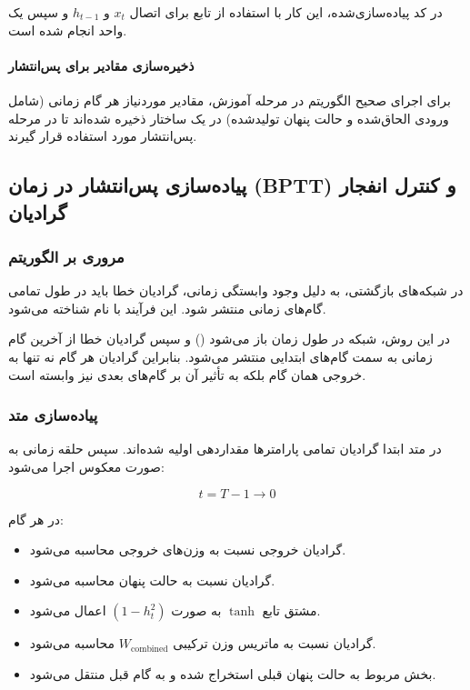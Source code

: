\documentclass{article}
\begin{document}
در کد پیاده‌سازی‌شده، این کار با استفاده از تابع  برای اتصال $x_t$ و $h_{t-1}$ و سپس یک  واحد انجام شده است.

\paragraph{ذخیره‌سازی مقادیر برای پس‌انتشار}

برای اجرای صحیح الگوریتم  در مرحله آموزش، مقادیر موردنیاز هر گام زمانی (شامل ورودی الحاق‌شده و حالت پنهان تولیدشده) در یک ساختار  ذخیره شده‌اند تا در مرحله پس‌انتشار مورد استفاده قرار گیرند.

\vspace{1em}

\subsection{پیاده‌سازی پس‌انتشار در زمان (BPTT) و کنترل انفجار گرادیان}

\subsubsection{مروری بر الگوریتم }

در شبکه‌های بازگشتی، به دلیل وجود وابستگی زمانی، گرادیان خطا باید در طول تمامی گام‌های زمانی منتشر شود. این فرآیند با نام  شناخته می‌شود.

در این روش، شبکه در طول زمان باز می‌شود () و سپس گرادیان خطا از آخرین گام زمانی به سمت گام‌های ابتدایی منتشر می‌شود. بنابراین گرادیان هر گام نه تنها به خروجی همان گام بلکه به تأثیر آن بر گام‌های بعدی نیز وابسته است.

\subsubsection{پیاده‌سازی متد }

در متد  ابتدا گرادیان تمامی پارامترها مقداردهی اولیه شده‌اند. سپس حلقه زمانی به صورت معکوس اجرا می‌شود:

\[
t = T-1 \rightarrow 0
\]

در هر گام:

\begin{itemize}
	\item گرادیان خروجی نسبت به وزن‌های خروجی محاسبه می‌شود.
	\item گرادیان نسبت به حالت پنهان محاسبه می‌شود.
	\item مشتق تابع $\tanh$ به صورت $(1 - h_t^2)$ اعمال می‌شود.
	\item گرادیان نسبت به ماتریس وزن ترکیبی $W_{\text{combined}}$ محاسبه می‌شود.
	\item بخش مربوط به حالت پنهان قبلی استخراج شده و به گام قبل منتقل می‌شود.
\end{itemize}
\end{document}
